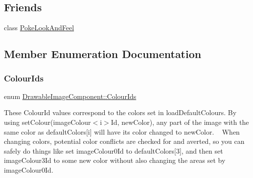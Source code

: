 \subsection*{Friends}
\begin{DoxyCompactItemize}
\item 
class \mbox{\hyperlink{classDrawableImageComponent_a434f7666c5d75bbef0c6cfbdc04d95fb}{Poke\+Look\+And\+Feel}}
\end{DoxyCompactItemize}


\subsection{Member Enumeration Documentation}
\mbox{\label{classDrawableImageComponent_a6cca33c1e175b64cf506f71afd55bd31}} 
\subsubsection{\texorpdfstring{Colour\+Ids}{ColourIds}}
{\footnotesize\ttfamily enum \mbox{\hyperlink{classDrawableImageComponent_a6cca33c1e175b64cf506f71afd55bd31}{Drawable\+Image\+Component\+::\+Colour\+Ids}}}

These Colour\+Id values correspond to the colors set in load\+Default\+Colours. By using set\+Colour(image\+Colour$<$i$>$\+Id, new\+Color), any part of the image with the same color as default\+Colors\mbox{[}i\mbox{]} will have its color changed to new\+Color. ~\newline
 When changing colors, potential color conflicts are checked for and averted, so you can safely do things like set image\+Colour0\+Id to default\+Colors\mbox{[}3\mbox{]}, and then set image\+Colour3\+Id to some new color without also changing the areas set by image\+Colour0\+Id.

